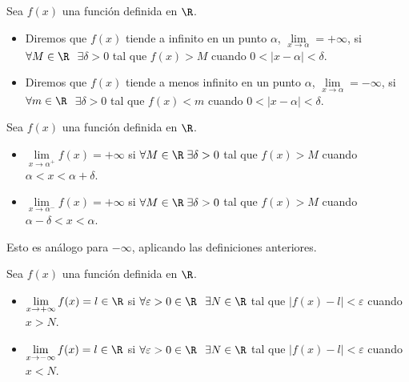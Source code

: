 \begin{definition}
	Sea \(f(x )\) una función definida en \(\R \). 
	
	\begin{itemize}
		\item Diremos que \(f(x )\) tiende a infinito en un punto \(\alpha\), \(\lim\limits_{x  \to \alpha} = + \infty \), si \(\forall M \in \R \) \(\; \exists \delta > 0 \) tal que \(f(x) > M \) cuando \(0 < \left\vert x - \alpha \right\vert < \delta\).
		      
		\item Diremos que \(f(x )\) tiende a menos infinito en un punto \(\alpha\), \(\lim\limits_{x  \to \alpha} = - \infty \), si \(\forall m \in \R \) \(\; \exists \delta > 0 \) tal que \(f(x) < m \) cuando \(0 < \left\vert x - \alpha \right\vert < \delta\).
	\end{itemize}
\end{definition}
\begin{definition}
	Sea \(f(x )\) una función definida en \(\R \). 
	
	\begin{itemize}
		\item \(\lim\limits_{x  \to \alpha^{+}} f(x) = +\infty\) si \(\forall M \in \R \; \exists \delta > 0 \) tal que \(f(x) > M \) cuando \(\alpha < x < \alpha + \delta\).
		      
		\item \(\lim\limits_{x  \to \alpha^{-}} f(x) = +\infty\) si \(\forall M \in \R \; \exists \delta > 0 \) tal que \(f(x) > M \) cuando \(\alpha - \delta < x < \alpha\).
	\end{itemize}
	
	Esto es análogo para \(-\infty\), aplicando las definiciones anteriores.   
\end{definition}
\begin{definition}
	Sea \(f(x )\) una función definida en \(\R \). 
	
	\begin{itemize}
		\item \(\lim\limits_{x  \to +\infty} f(x) = l \in \R \) si \(\forall \varepsilon > 0 \in \R \) \(\; \exists N \in \R \) tal que \(\left\vert f(x) - l  \right\vert < \varepsilon\) cuando \(x > N \).
		\item \(\lim\limits_{x  \to - \infty} f(x) = l \in \R \) si \(\forall \varepsilon > 0 \in \R \) \(\; \exists N \in \R \) tal que \(\left\vert f(x) - l  \right\vert < \varepsilon\) cuando \(x < N \).
	\end{itemize}
\end{definition}


